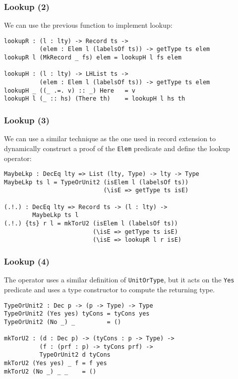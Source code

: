 \documentclass{beamer}
\begin{document}
\begin{frame}[fragile]
\frametitle{Lookup (2)}

We can use the previous function to implement lookup:

\begin{definition}
\begin{verbatim}
lookupR : (l : lty) -> Record ts -> 
          (elem : Elem l (labelsOf ts)) -> getType ts elem
lookupR l (MkRecord _ fs) elem = lookupH l fs elem

lookupH : (l : lty) -> LHList ts -> 
          (elem : Elem l (labelsOf ts)) -> getType ts elem
lookupH _ ((_ .=. v) :: _) Here   = v
lookupH l (_ :: hs) (There th)    = lookupH l hs th
\end{verbatim}
\end{definition}

\end{frame}

\begin{frame}[fragile]
\frametitle{Lookup (3)}

We can use a similar technique as the one used in record extension to dynamically construct a proof of the \texttt{Elem} predicate and define the lookup operator:

\begin{definition}
\begin{verbatim}
MaybeLkp : DecEq lty => List (lty, Type) -> lty -> Type
MaybeLkp ts l = TypeOrUnit2 (isElem l (labelsOf ts))
                            (\isE => getType ts isE)

(.!.) : DecEq lty => Record ts -> (l : lty) -> 
        MaybeLkp ts l
(.!.) {ts} r l = mkTorU2 (isElem l (labelsOf ts))
                         (\isE => getType ts isE)
                         (\isE => lookupR l r isE)
\end{verbatim}
\end{definition}

\end{frame}

\begin{frame}[fragile]
\frametitle{Lookup (4)}

The operator uses a similar definition of \texttt{UnitOrType}, but it acts on the \texttt{Yes} predicate and uses a type constructor to compute the returning type.

\begin{definition}
\begin{verbatim}
TypeOrUnit2 : Dec p -> (p -> Type) -> Type
TypeOrUnit2 (Yes yes) tyCons = tyCons yes
TypeOrUnit2 (No _) _         = ()

mkTorU2 : (d : Dec p) -> (tyCons : p -> Type) -> 
          (f : (prf : p) -> tyCons prf) ->
          TypeOrUnit2 d tyCons
mkTorU2 (Yes yes) _ f = f yes
mkTorU2 (No _) _ _    = ()
\end{verbatim}
\end{definition}

\end{frame}
\end{document}
